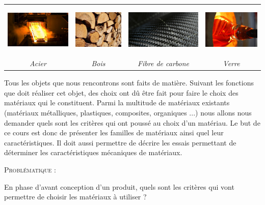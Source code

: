 \documentclass[11pt,oneside]{article}
\begin{document}
\begin{center}
\begin{tabular}{cccc}
\includegraphics[height=2.5cm]{png/acier} &
\includegraphics[height=2.5cm]{png/bois} &
\includegraphics[height=2.5cm]{png/composite} &
\includegraphics[height=2.5cm]{png/verre}\\
\textit{Acier \cite{acier}} & 
\textit{Bois} & 
\textit{Fibre de carbone \cite{composite}} & 
\textit{Verre \cite{verre}} \\
\end{tabular}
\end{center}

Tous les objets que nous rencontrons sont faits de matière. Suivant les fonctions que doit réaliser cet objet, des choix ont dû être fait pour faire le choix des matériaux qui le constituent. Parmi la multitude de matériaux existants (matériaux métalliques, plastiques, composites, organiques ...) nous allons nous demander quels sont les critères qui ont poussé au choix d'un matériau. Le but de ce cours est donc de présenter les familles de matériaux ainsi quel leur caractéristiques. Il doit aussi permettre de décrire les essais permettant de déterminer les caractéristiques mécaniques de matériaux.



\begin{prob}
\textsc{Problématique :}

En phase d'avant conception d'un produit, quels sont les critères qui vont permettre de choisir les matériaux à utiliser ?
\end{prob}
\end{document}
